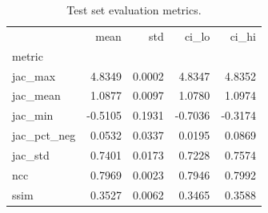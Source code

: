 \begin{table}
\caption{Test set evaluation metrics.}
\label{tab:results}
\begin{tabular}{lrrrr}
\toprule
 & mean & std & ci_lo & ci_hi \\
metric &  &  &  &  \\
\midrule
jac_max & 4.8349 & 0.0002 & 4.8347 & 4.8352 \\
jac_mean & 1.0877 & 0.0097 & 1.0780 & 1.0974 \\
jac_min & -0.5105 & 0.1931 & -0.7036 & -0.3174 \\
jac_pct_neg & 0.0532 & 0.0337 & 0.0195 & 0.0869 \\
jac_std & 0.7401 & 0.0173 & 0.7228 & 0.7574 \\
ncc & 0.7969 & 0.0023 & 0.7946 & 0.7992 \\
ssim & 0.3527 & 0.0062 & 0.3465 & 0.3588 \\
\bottomrule
\end{tabular}
\end{table}
